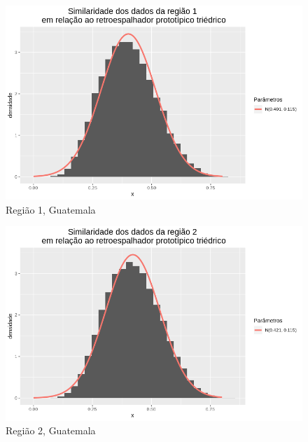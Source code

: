 \documentclass[12pt]{article}
\begin{document}
\begin{figure}[!h]
    \centering
    \vspace{0.1\linewidth}
    \includegraphics[width = 0.95\linewidth]{../../Images/Report_18_12_17/tri_region1.png}
    \caption{Região 1, Guatemala}
    \label{fig:tri_r1}
\end{figure}

\begin{figure}[!h]
    \centering
    \vspace{0.15\linewidth}
    \includegraphics[width = 0.95\linewidth]{../../Images/Report_18_12_17/tri_region2.png}
    \caption{Região 2, Guatemala}
    \label{fig:tri_r2}
\end{figure}
\end{document}
